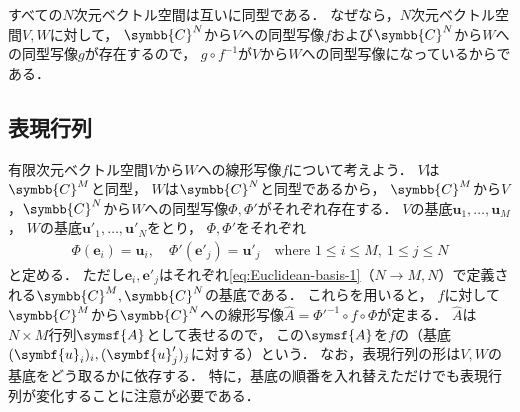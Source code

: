 \documentclass[
]{sotsu}
\begin{document}
すべての$N$次元ベクトル空間は互いに同型である．
なぜなら，$N$次元ベクトル空間$V, W$に対して，
$\symbb{C}^N$から$V$への同型写像$f$および$\symbb{C}^N$から$W$への同型写像$g$が存在するので，
$g \circ f^{-1}$が$V$から$W$への同型写像になっているからである．



\subsection{表現行列}

有限次元ベクトル空間$V$から$W$への線形写像$f$について考えよう．
$V$は$\symbb{C}^M$と同型，
$W$は$\symbb{C}^N$と同型であるから，
$\symbb{C}^M$から$V$，$\symbb{C}^N$から$W$への同型写像$\Phi, \Phi'$がそれぞれ存在する．
$V$の基底$\symbf{u}_1, \dots, \symbf{u}_M$，
$W$の基底$\symbf{u}'_1, \dots, \symbf{u}'_N$をとり，
$\Phi, \Phi'$をそれぞれ
\begin{align*}
    \Phi(\symbf{e}_i) = \symbf{u}_i,
    \quad 
    \Phi'(\symbf{e}'_j) = \symbf{u}'_j
    \quad 
    \text{where }
    1 \leq i \leq M, \  
    1 \leq j \leq N
\end{align*}
と定める．
ただし$\symbf{e}_i, \symbf{e}'_j$はそれぞれ\cref{eq:Euclidean-basis-1}（$N \to M, N$）で定義される$\symbb{C}^M, \symbb{C}^N$の基底である．
これらを用いると，
$f$に対して$\symbb{C}^M$から$\symbb{C}^N$への線形写像$\hat{A} = \Phi'^{-1} \circ f \circ \Phi$が定まる．
$\hat{A}$は$N \times M$行列$\symsf{A}$として表せるので，
この$\symsf{A}$を$f$の（基底$\sequ{\symbf{u}_i}[i], \sequ{\symbf{u}'_j}[j]$に対する）という．
なお，表現行列の形は$V, W$の基底をどう取るかに依存する．
特に，基底の順番を入れ替えただけでも表現行列が変化することに注意が必要である．
\end{document}
